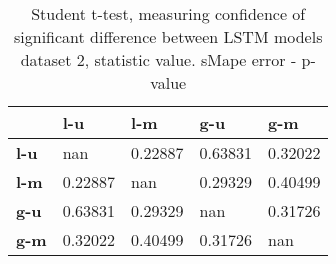 \begin{table}[H]
\centering
\caption{Student t-test, measuring confidence of significant difference between LSTM models dataset 2, statistic value. sMape error - p-value}
\label{table:ttest-p-values-lstm-experiments-sMAPE-dataset-2}
\begin{tabular}{lllll}
\toprule
{} &      l-u &      l-m &      g-u &      g-m \\
\midrule
\textbf{l-u} &      nan &  0.22887 &  0.63831 &  0.32022 \\
\textbf{l-m} &  0.22887 &      nan &  0.29329 &  0.40499 \\
\textbf{g-u} &  0.63831 &  0.29329 &      nan &  0.31726 \\
\textbf{g-m} &  0.32022 &  0.40499 &  0.31726 &      nan \\
\bottomrule
\end{tabular}
\end{table}
